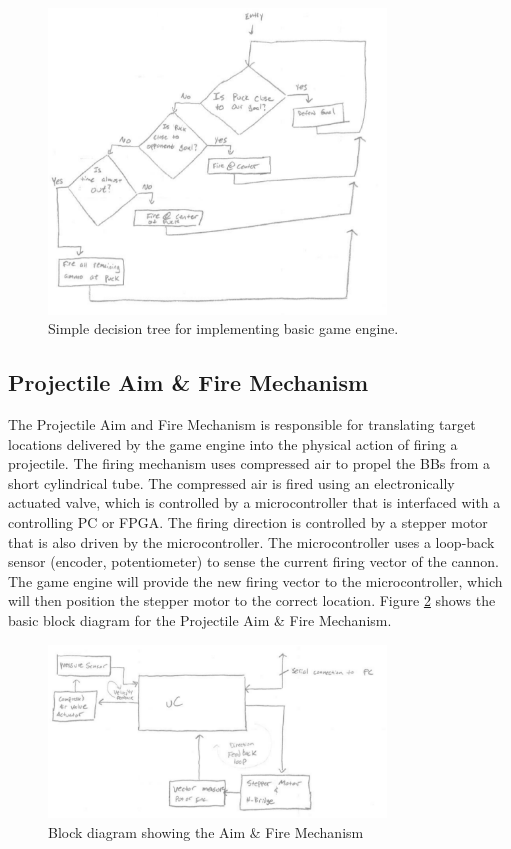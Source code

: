 \documentclass[letterpaper,10pt,onecolumn,titlepage]{article}
\begin{document}
\begin{figure}[h!]
  \centering
  \includegraphics[width=0.8\textwidth]{./decision_tree.eps}
  \caption{Simple decision tree for implementing basic game engine.}
  \label{figure_decisions}
\end{figure}

\subsection{Projectile Aim \& Fire Mechanism}
The Projectile Aim and Fire Mechanism is responsible for translating target
locations delivered by the game engine into the physical action of firing a 
projectile.  The firing mechanism uses compressed air to propel the BBs from a
short cylindrical tube.  The compressed air is fired using an electronically
actuated valve, which is controlled by a microcontroller that is interfaced 
with a controlling PC or FPGA.  The firing direction is controlled by a stepper
motor that is also driven by the microcontroller.  The microcontroller uses a
loop-back sensor (encoder, potentiometer) to sense the current firing vector of
the cannon.  The game engine will provide the new firing vector to the
microcontroller, which will then position the stepper motor to the correct
location.  Figure \ref{figure_fire_block} shows the basic block diagram for
the Projectile Aim \& Fire Mechanism.


\begin{figure}[h!]
  \centering
  \includegraphics[width=0.8\textwidth]{./motor_block_diag.eps}
  \caption{Block diagram showing the Aim \& Fire Mechanism}
  \label{figure_fire_block}
\end{figure}
\end{document}
